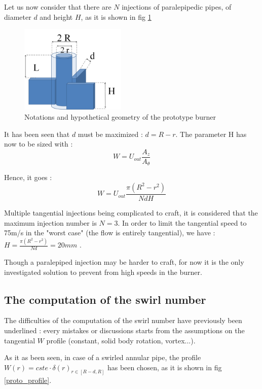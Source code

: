Let us now consider that there are $N$ injections of paralepipedic pipes, of diameter $d$ and height $H$, as it is shown in fig \ref{proto_par}

\begin{figure}[h!]
  \centering
\includegraphics[width=0.45\textwidth]{fig/proto_par.png}
  \caption{Notations and hypothetical geometry of the prototype burner}
 \label{proto_par}
\end{figure}
It has been seen that $d$ must be maximized : $d=R-r$. The parameter H has now to be sized with :
\begin{equation}
W =U_{out}\frac{A_{z}}{A_{\theta}}
\end{equation}


Hence, it goes :
\begin{equation}
W=U_{out}\frac{\pi (R^2-r^2)}{NdH}
\end{equation}

Multiple tangential injections being complicated to craft, it is considered that the maximum injection number is $N=3$. In order to limit the tangential speed to 75m/s in the "worst case" (the flow is entirely tangential), we have : $H=\frac{\pi (R^2-r^2)}{Nd}=20mm$ .

Though a paralepiped injection may be harder to craft, for now it is the only investigated solution to prevent from high speeds in the burner.

\subsection{The computation of the swirl number}

The difficulties of the computation of the swirl number have previously been underlined : every mistakes or discussions starts from the assumptions on the tangential $W$ profile (constant, solid body rotation, vortex...). 

As it as been seen, in case of a swirled annular pipe, the profile $W(r)=cste \cdot \delta(r)_{r \in [R-d,R]}$ has been chosen, as it is shown in fig \ref{proto_profile}.

